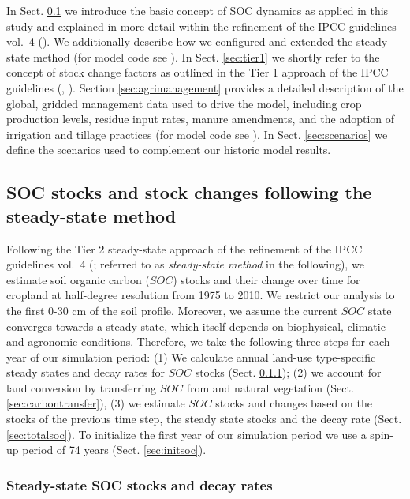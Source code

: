 \documentclass[gc, manuscript]{copernicus}
\begin{document}
In Sect. \ref{sec:carbonbudget} we introduce the basic concept of SOC dynamics as applied in this study and explained in more detail within the refinement of the IPCC guidelines vol.~4 (\citep{calvo_buendia_ipcc_2019}). We additionally describe how we configured and extended the steady-state method (for model code see \citet{mrsoil_2020}). In Sect. \ref{sec:tier1} we shortly refer to the concept of stock change factors as outlined in the Tier 1 approach of the IPCC guidelines (\citep{eggleston_hs_ipcc_2006}, \citep{calvo_buendia_ipcc_2019}).
Section \ref{sec:agrimanagement} provides a detailed description of the global, gridded management data used to drive the model, including crop production levels, residue input rates, manure amendments, and the adoption of irrigation and tillage practices (for model code see \citet{mrcommons_2020}). In Sect. \ref{sec:scenarios} we define the scenarios used to complement our historic model results.

\hypertarget{sec:carbonbudget}{%
\subsection{SOC stocks and stock changes following the steady-state method}\label{sec:carbonbudget}}

Following the Tier 2 steady-state approach of the refinement of the IPCC guidelines vol.~4 (\citep{calvo_buendia_ipcc_2019}; referred to as \textit{steady-state method} in the following), we estimate soil organic carbon (\(SOC\)) stocks and their change over time for cropland at half-degree resolution from 1975 to 2010. We restrict our analysis to the first 0-30 cm of the soil profile. Moreover, we assume the current \(SOC\) state converges towards a steady state, which itself depends on biophysical, climatic and agronomic conditions.
Therefore, we take the following three steps for each year of our simulation period:
(1) We calculate annual land-use type-specific steady states and decay rates for \(SOC\) stocks (Sect. \ref{sec:steadystates});
(2) we account for land conversion by transferring \(SOC\) from and natural vegetation (Sect. \ref{sec:carbontransfer}),
(3) we estimate \(SOC\) stocks and changes based on the stocks of the previous time step, the steady state stocks and the decay rate (Sect. \ref{sec:totalsoc}).
To initialize the first year of our simulation period we use a spin-up period of 74 years (Sect. \ref{sec:initsoc}).

\hypertarget{sec:steadystates}{%
\subsubsection{Steady-state SOC stocks and decay rates}\label{sec:steadystates}}
\end{document}
